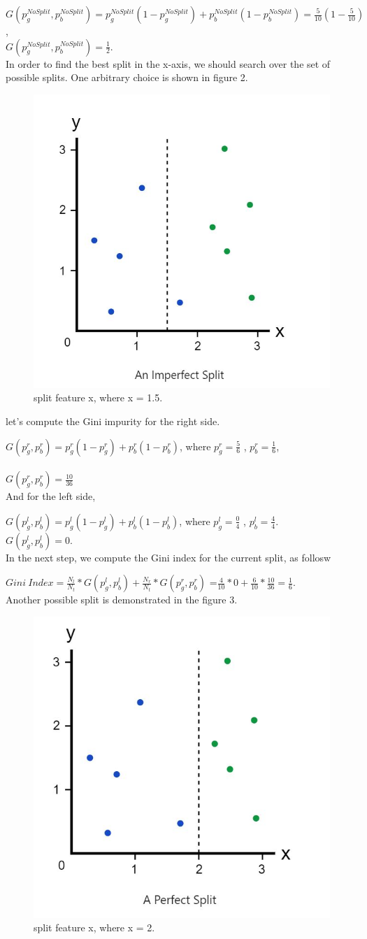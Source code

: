 $G(p_g^{No Split},p_b^{No Split}) =  p_{g}^{No Split}(1- p_{g}^{No Split}) + p_{b}^{No Split}(1-p_{b}^{No Split}) = \frac{5}{10}(1 - \frac{5}{10})$,\\
$G(p_g^{No Split},p_b^{No Split}) =  \frac{1}{2}.$ \\



In order to find the best split in the x-axis, we should search over the set of possible splits. One arbitrary choice is shown in figure 2.

\begin{figure}[h]
	\centering
	\includegraphics[scale=0.2, width=0.3\columnwidth]{../figs/gini3.JPG}
	\caption{split feature x, where x = 1.5.}
	\label{}
\end{figure}

let's compute the Gini impurity for the right side.

$G(p_g^{r},p_b^{r}) =  p_{g}^{r}(1- p_{g}^{r}) + p_{b}^{r}(1-p_{b}^{r})$, where  $p_{g}^{r} = \frac{5}{6}$ ,  $p_{b}^{r} = \frac{1}{6}$, \\ \\
 $G(p_g^{r},p_b^{r}) = \frac{10}{36}$\\


And for the left side,

$G(p_g^{l},p_b^{l}) =  p_{g}^{l}(1- p_{g}^{l}) + p_{b}^{l}(1-p_{b}^{l})$, where  $p_{g}^{l} = \frac{0}{4}$ ,  $p_{b}^{l} = \frac{4}{4}$. \\
$G(p_g^{l},p_b^{l}) = 0.$\\

In the next step, we compute the Gini index for the current split, as follosw
 
 $Gini\: Index = \frac{N_{l}}{N_{t}}*G(p_g^{l},p_b^{l}) + \frac{N_{r}}{N_{t}}*G(p_g^{r},p_b^{r})$  =$ \frac{4}{10}*0 + \frac{6}{10}*\frac{10}{36} = \frac{1}{6}.$ \\
 
Another possible split is demonstrated in the figure 3.
 
 \begin{figure}[h]
	\centering
	\includegraphics[scale=0.2, width=0.3\columnwidth]{../figs/gini2.JPG}
	\caption{split feature x, where x = 2. }
	\label{}
\end{figure}


